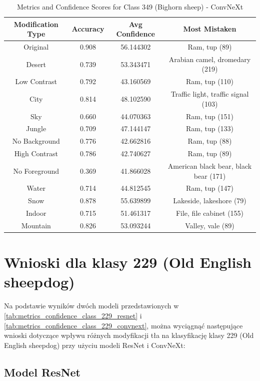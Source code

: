 \begin{table}
	\centering
	\begin{tabular}{|c|c|c|c|}
		\hline
		\textbf{Modification Type} & \textbf{Accuracy} & \textbf{Avg Confidence} & \textbf{Most Mistaken} \\
		\hline
		Original & 0.908 & 56.144302 & Ram, tup (89) \\
		\hline
		Desert & 0.739 & 53.343471 & Arabian camel, dromedary (219) \\
		\hline
		Low Contrast & 0.792 & 43.160569 & Ram, tup (110) \\
		\hline
		City & 0.814 & 48.102590 & Traffic light, traffic signal (103) \\
		\hline
		Sky & 0.660 & 44.070363 & Ram, tup (151) \\
		\hline
		Jungle & 0.709 & 47.144147 & Ram, tup (133) \\
		\hline
		No Background & 0.776 & 42.662816 & Ram, tup (88) \\
		\hline
		High Contrast & 0.786 & 42.740627 & Ram, tup (89) \\
		\hline
		No Foreground & 0.369 & 41.866028 & American black bear, black bear (171) \\
		\hline
		Water & 0.714 & 44.812545 & Ram, tup (147) \\
		\hline
		Snow & 0.878 & 55.639899 & Lakeside, lakeshore (79) \\
		\hline
		Indoor & 0.715 & 51.461317 & File, file cabinet (155) \\
		\hline
		Mountain & 0.826 & 53.093244 & Valley, vale (89) \\
		\hline
	\end{tabular}
	\caption{Metrics and Confidence Scores for Class 349 (Bighorn sheep) - ConvNeXt}
	\label{tab:metrics_confidence_class_349_convnext}
\end{table}

\section*{Wnioski dla klasy 229 (Old English sheepdog)}

Na podstawie wyników dwóch modeli przedstawionych w \ref*{tab:metrics_confidence_class_229_resnet} i \ref*{tab:metrics_confidence_class_229_convnext}, można wyciągnąć następujące wnioski dotyczące wpływu różnych 
modyfikacji tła na klasyfikację klasy 229 (Old English sheepdog) przy użyciu modeli ResNet i ConvNeXt:

\subsection*{Model ResNet}

